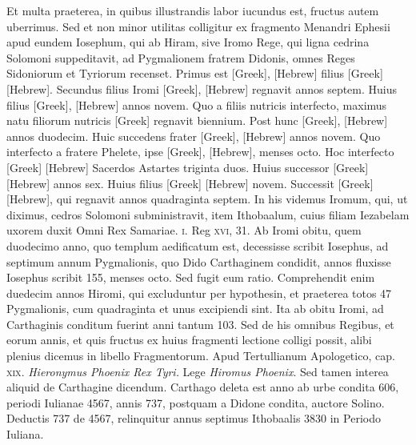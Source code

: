 Et
multa praeterea, in quibus illustrandis labor iucundus est, fructus
autem uberrimus.
Sed et non minor utilitas colligitur ex fragmento
Menandri Ephesii apud eundem Iosephum, qui ab Hiram, sive
Iromo Rege, qui ligna cedrina Solomoni suppeditavit, ad Pygmalionem
fratrem Didonis, omnes Reges Sidoniorum et Tyriorum
recenset.
Primus est \textgreek{[Greek]}, \texthebrew{[Hebrew]}
 filius \textgreek{[Greek]} \texthebrew{[Hebrew]}.
Secundus filius Iromi \textgreek{[Greek]}, \texthebrew{[Hebrew]}
 regnavit annos septem.
Huius filius \textgreek{[Greek]}, \texthebrew{[Hebrew]} annos novem.
Quo a filiis nutricis
interfecto, maximus natu filiorum nutricis \textgreek{[Greek]} regnavit
biennium.
Post hunc \textgreek{[Greek]}, \texthebrew{[Hebrew]} annos
duodecim.
Huic succedens frater \textgreek{[Greek]}, \texthebrew{[Hebrew]} annos novem.
Quo interfecto a fratere Phelete, ipse
 \textgreek{[Greek]}, \texthebrew{[Hebrew]}, menses octo.
Hoc interfecto \textgreek{[Greek]} \texthebrew{[Hebrew]}
 Sacerdos Astartes triginta
duos.
Huius successor \textgreek{[Greek]} \texthebrew{[Hebrew]} annos sex.
Huius filius
\textgreek{[Greek]} \texthebrew{[Hebrew]} novem.
Successit \textgreek{[Greek]} \texthebrew{[Hebrew]}, qui regnavit
annos quadraginta septem.
In his videmus Iromum, qui, ut
diximus, cedros Solomoni subministravit, item Ithobaalum, cuius
filiam Iezabelam uxorem duxit Omni Rex Samariae. \textsc{i}. Reg \textsc{xvi},
31.
Ab Iromi obitu, quem duodecimo anno, quo templum aedificatum
est, decessisse scribit Iosephus, ad septimum annum Pygmalionis,
quo Dido Carthaginem condidit, annos fluxisse Iosephus
scribit 155, menses octo.
Sed fugit eum ratio.
Comprehendit
enim duedecim annos Hiromi, qui excluduntur per hypothesin,
et praeterea totos 47 Pygmalionis, cum quadraginta et
unus excipiendi sint.
Ita ab obitu Iromi, ad Carthaginis conditum
fuerint anni tantum 103.
Sed de his omnibus Regibus, et
eorum annis, et quis fructus ex huius fragmenti lectione colligi
possit, alibi plenius dicemus in libello Fragmentorum.
Apud Tertullianum Apologetico, cap. \textsc{xix}.
\textit{Hieronymus Phoenix Rex Tyri.}
Lege \textit{Hiromus Phoenix}.
Sed tamen interea aliquid de Carthagine
dicendum.
Carthago deleta est anno ab urbe condita 606,
periodi Iulianae 4567, annis 737, postquam a Didone condita,
auctore Solino.
Deductis 737 de 4567, relinquitur annus
septimus Ithobaalis 3830 in Periodo Iuliana.
